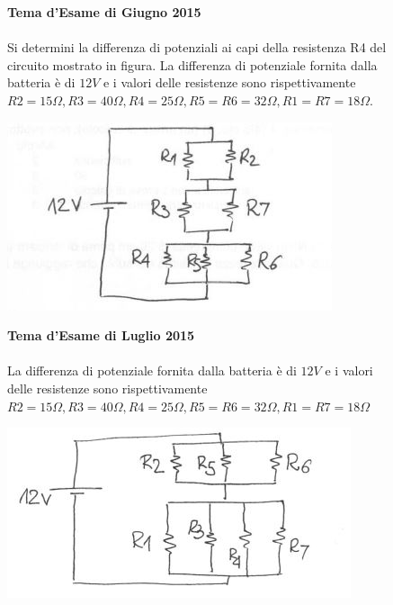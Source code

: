 \begin{figure}[h!]
\textbf{Tema d'Esame di Giugno 2015}\\ \\
Si determini la differenza di potenziali ai capi della resistenza R4 del circuito mostrato in figura. La differenza di potenziale fornita dalla batteria è di $12V$ e i valori delle resistenze sono rispettivamente $R2=15\Omega, R3=40\Omega, R4=25\Omega, R5=R6=32\Omega, R1=R7=18\Omega$.
\begin{center}
		\includegraphics[scale=1]{ES5/GIU052015.jpg}
	\end{center}
\end{figure}

\begin{figure}[h!]
\textbf{Tema d'Esame di Luglio 2015}\\ \\
La differenza di potenziale fornita dalla batteria è di $12V$ e i valori delle resistenze sono rispettivamente $R2=15\Omega, R3=40\Omega, R4=25\Omega, R5=R6=32\Omega, R1=R7=18\Omega$
\begin{center}
		\includegraphics[scale=1]{ES5/LUG052015.jpg}
	\end{center}
\end{figure}